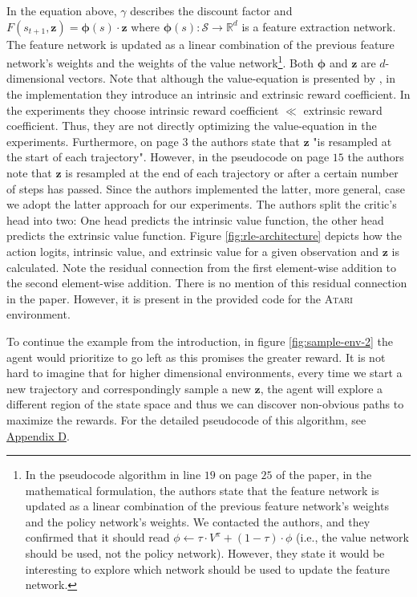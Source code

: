 \documentclass[10pt]{article} %
\begin{document}
\noindent In the equation above, $\gamma$ describes the discount factor and $F(s_{t+1}, \textbf{z}) =  \boldsymbol{\phi}(s) \cdot \textbf{z}$ where $\boldsymbol{\phi}(s): \mathcal{S} \rightarrow \mathbb{R}^{d}$ is a feature extraction network. The feature network is updated as a linear combination of the previous feature network's weights and the weights of the value network\footnote{In the pseudocode algorithm in line $19$ on page $25$ of the paper, in the mathematical formulation, the authors state that the feature network is updated as a linear combination of the previous feature network's weights and the policy network's weights. We contacted the authors, and they confirmed that it should read $\phi \leftarrow \tau \cdot V^\pi + (1 - \tau ) \cdot \phi$ (i.e., the value network should be used, not the policy network). However, they state it would be interesting to explore which network should be used to update the feature network.}. Both $\boldsymbol{\phi}$ and $\textbf{z}$ are $d$-dimensional vectors. Note that although the value-equation is presented by \cite{rle-paper}, in the implementation they introduce an intrinsic and extrinsic reward coefficient. In the experiments they choose intrinsic reward coefficient $\ll$ extrinsic reward coefficient. Thus, they are not directly optimizing the value-equation in the experiments. Furthermore, on page $3$ the authors state that $\textbf{z}$ "is resampled at the start of each trajectory". However, in the pseudocode on page $15$ the authors note that $\textbf{z}$ is resampled at the end of each trajectory or after a certain number of steps has passed. Since the authors implemented the latter, more general, case we adopt the latter approach for our experiments. The authors split the critic's head into two: One head predicts the intrinsic value function, the other head predicts the extrinsic value function. Figure \ref{fig:rle-architecture} depicts how the action logits, intrinsic value, and extrinsic value for a given observation and $\textbf{z}$ is calculated. Note the residual connection from the first element-wise addition to the second element-wise addition. There is no mention of this residual connection in the paper. However, it is present in the provided code for the \textsc{Atari} environment. 

To continue the example from the introduction, in figure \ref{fig:sample-env-2} the agent would prioritize to go left as this promises the greater reward. It is not hard to imagine that for higher dimensional environments, every time we start a new trajectory and correspondingly sample a new $\textbf{z}$, the agent will explore a different region of the state space and thus we can discover non-obvious paths to maximize the rewards. For the detailed pseudocode of this algorithm, see \hyperlink{link-rle}{Appendix D}.
\end{document}

